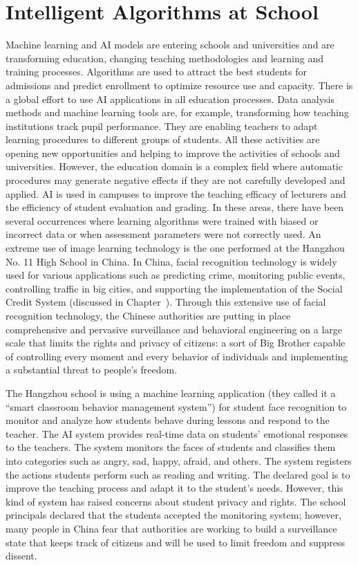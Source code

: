 \section{\label{sec:5.5}Intelligent Algorithms at School}

Machine learning and AI models are entering schools and universities and are transforming education, changing teaching methodologies and learning and training processes. Algorithms are used to attract the best students for admissions and predict enrollment to optimize resource use and capacity. There is a global effort to use AI applications in all education processes. Data analysis methods and machine learning tools are, for example, transforming how teaching institutions track pupil performance. They are enabling teachers to adapt learning procedures to different groups of students. All these activities are opening new opportunities and helping to improve the activities of schools and universities. However, the education domain is a complex field where automatic procedures may generate negative effects if they are not carefully developed and applied. AI is used in campuses to improve the teaching efficacy of lecturers and the efficiency of student evaluation and grading. In these areas, there have been several occurrences where learning algorithms were trained with biased or incorrect data or when assessment parameters were not correctly used. An extreme use of image learning technology is the one performed at the Hangzhou No. 11 High School in China. In China, facial recognition technology is widely used for various applications such as predicting crime, monitoring public events, controlling traffic in big cities, and supporting the implementation of the Social Credit System (discussed in Chapter~). Through this extensive use of facial recognition technology, the Chinese authorities are putting in place comprehensive and pervasive surveillance and behavioral engineering on a large scale that limits the rights and privacy of citizens: a sort of Big Brother capable of controlling every moment and every behavior of individuals and implementing a substantial threat to people's freedom.

The Hangzhou school is using a machine learning application (they called it a ``smart classroom behavior management system'') for student face recognition to monitor and analyze how students behave during lessons and respond to the teacher. The AI system provides real-time data on students' emotional responses to the teachers. The system monitors the faces of students and classifies them into categories such as angry, sad, happy, afraid, and others. The system registers the actions students perform such as reading and writing. The declared goal is to improve the teaching process and adapt it to the student's needs. However, this kind of system has raised concerns about student privacy and rights. The school principals declared that the students accepted the monitoring system; however, many people in China fear that authorities are working to build a surveillance state that keeps track of citizens and will be used to limit freedom and suppress dissent.


